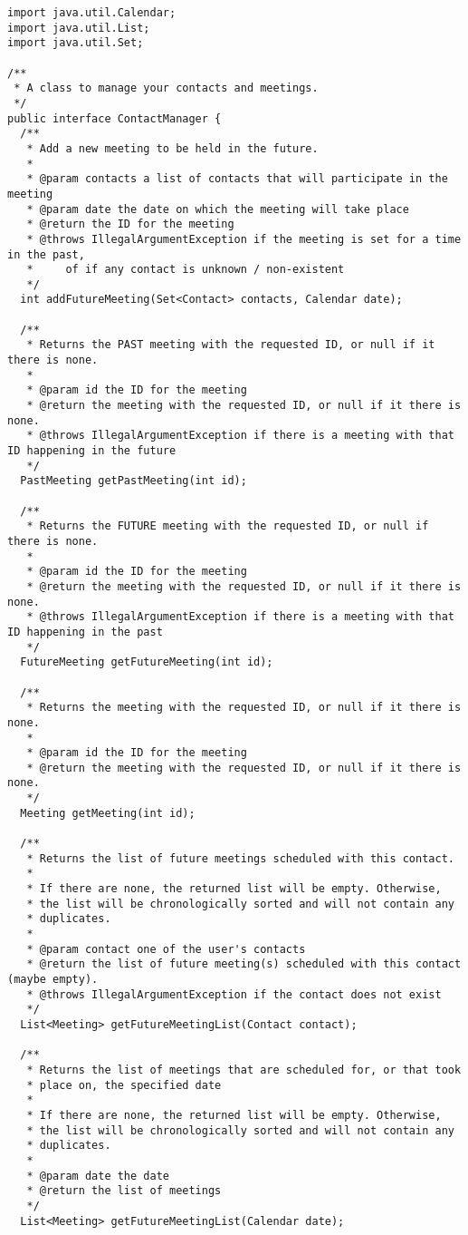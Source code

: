 \documentclass{article}
\begin{document}
\begin{verbatim}
import java.util.Calendar;
import java.util.List;
import java.util.Set;

/**
 * A class to manage your contacts and meetings. 
 */
public interface ContactManager {
  /**
   * Add a new meeting to be held in the future.
   * 
   * @param contacts a list of contacts that will participate in the meeting
   * @param date the date on which the meeting will take place
   * @return the ID for the meeting
   * @throws IllegalArgumentException if the meeting is set for a time in the past, 
   *     of if any contact is unknown / non-existent 
   */
  int addFutureMeeting(Set<Contact> contacts, Calendar date);

  /**
   * Returns the PAST meeting with the requested ID, or null if it there is none. 
   *
   * @param id the ID for the meeting
   * @return the meeting with the requested ID, or null if it there is none. 
   * @throws IllegalArgumentException if there is a meeting with that ID happening in the future
   */
  PastMeeting getPastMeeting(int id);

  /**
   * Returns the FUTURE meeting with the requested ID, or null if there is none. 
   * 
   * @param id the ID for the meeting
   * @return the meeting with the requested ID, or null if it there is none. 
   * @throws IllegalArgumentException if there is a meeting with that ID happening in the past
   */
  FutureMeeting getFutureMeeting(int id);

  /**
   * Returns the meeting with the requested ID, or null if it there is none. 
   * 
   * @param id the ID for the meeting
   * @return the meeting with the requested ID, or null if it there is none. 
   */
  Meeting getMeeting(int id);

  /**
   * Returns the list of future meetings scheduled with this contact.
   * 
   * If there are none, the returned list will be empty. Otherwise,
   * the list will be chronologically sorted and will not contain any
   * duplicates. 
   * 
   * @param contact one of the user's contacts
   * @return the list of future meeting(s) scheduled with this contact (maybe empty).
   * @throws IllegalArgumentException if the contact does not exist
   */
  List<Meeting> getFutureMeetingList(Contact contact);

  /**
   * Returns the list of meetings that are scheduled for, or that took
   * place on, the specified date
   * 
   * If there are none, the returned list will be empty. Otherwise,
   * the list will be chronologically sorted and will not contain any
   * duplicates. 
   * 
   * @param date the date
   * @return the list of meetings
   */
  List<Meeting> getFutureMeetingList(Calendar date);


\end{verbatim}
\end{document}
